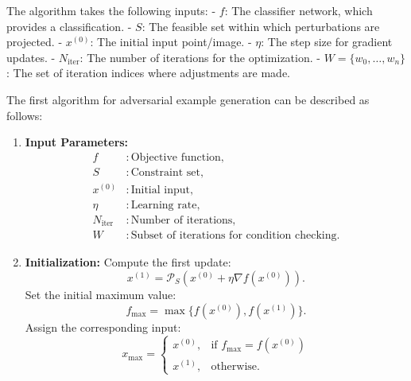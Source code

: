 The algorithm takes the following inputs:
- $f$: The classifier network, which provides a classification.
- $S$: The feasible set within which perturbations are projected.
- $x^{(0)}$: The initial input point/image.
- $\eta$: The step size for gradient updates.
- $N_{\text{iter}}$: The number of iterations for the optimization.
- $W = \{w_0, \ldots, w_n\}$: The set of iteration indices where adjustments are made.


The first algorithm for adversarial example generation can be described as follows:

\begin{enumerate}
    \item \textbf{Input Parameters:}  
    \begin{align*}
    f &: \text{Objective function}, \\
    S &: \text{Constraint set}, \\
    x^{(0)} &: \text{Initial input}, \\
    \eta &: \text{Learning rate}, \\
    N_{\text{iter}} &: \text{Number of iterations}, \\
    W &: \text{Subset of iterations for condition checking}.
    \end{align*}

    \item \textbf{Initialization:}  
    Compute the first update:  
    \[
    x^{(1)} = \mathcal{P}_S \left( x^{(0)} + \eta \nabla f(x^{(0)}) \right).
    \]
    Set the initial maximum value:  
    \[
    f_{\text{max}} = \max \{f(x^{(0)}), f(x^{(1)})\}.
    \]
    Assign the corresponding input:  
    \[
    x_{\text{max}} = 
    \begin{cases} 
    x^{(0)}, & \text{if } f_{\text{max}} = f(x^{(0)}) \\
    x^{(1)}, & \text{otherwise}.
    \end{cases}
    \]


\end{enumerate}
